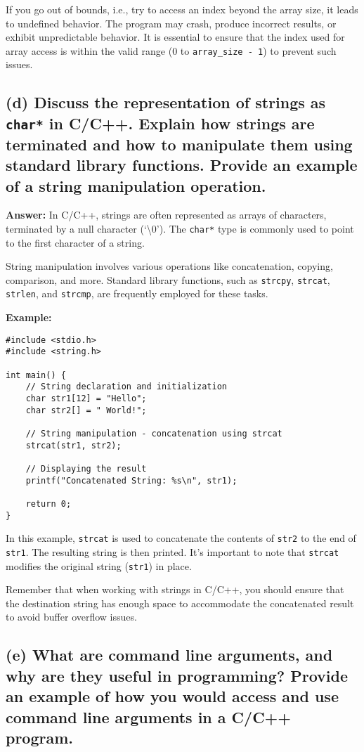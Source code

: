 \documentclass{article}
\begin{document}
\begin{enumerate}
If you go out of bounds, i.e., try to access an index beyond the array size, it leads to undefined behavior. The program may crash, produce incorrect results, or exhibit unpredictable behavior. It is essential to ensure that the index used for array access is within the valid range (0 to \texttt{array\_size - 1}) to prevent such issues.

\subsection*{(d) Discuss the representation of strings as \texttt{char*} in C/C++. Explain how strings are terminated and how to manipulate them using standard library functions. Provide an example of a string manipulation operation.}

\textbf{Answer:} In C/C++, strings are often represented as arrays of characters, terminated by a null character (`\textbackslash0'). The \texttt{char*} type is commonly used to point to the first character of a string.

String manipulation involves various operations like concatenation, copying, comparison, and more. Standard library functions, such as \texttt{strcpy}, \texttt{strcat}, \texttt{strlen}, and \texttt{strcmp}, are frequently employed for these tasks.

\textbf{Example:}
\begin{verbatim}
#include <stdio.h>
#include <string.h>

int main() {
    // String declaration and initialization
    char str1[12] = "Hello";
    char str2[] = " World!";

    // String manipulation - concatenation using strcat
    strcat(str1, str2);

    // Displaying the result
    printf("Concatenated String: %s\n", str1);

    return 0;
}
\end{verbatim}

In this example, \texttt{strcat} is used to concatenate the contents of \texttt{str2} to the end of \texttt{str1}. The resulting string is then printed. It's important to note that \texttt{strcat} modifies the original string (\texttt{str1}) in place.

Remember that when working with strings in C/C++, you should ensure that the destination string has enough space to accommodate the concatenated result to avoid buffer overflow issues.

\subsection*{(e) What are command line arguments, and why are they useful in programming? Provide an example of how you would access and use command line arguments in a C/C++ program.}


\end{enumerate}
\end{document}
